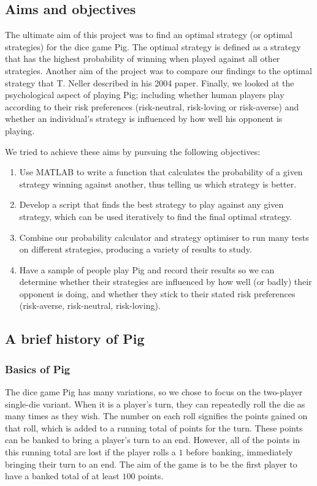 \documentclass[a4paper,titlepage]{article}
\begin{document}
\subsection{Aims and objectives}
The ultimate aim of this project was to find an optimal strategy (or optimal strategies) for the dice game Pig. The optimal strategy is defined as a strategy that has the highest probability of winning when played against all other strategies. Another aim of the project was to compare our findings to the optimal strategy that T. Neller described in his 2004 paper\cite{neller2004optimal}. Finally, we looked at the psychological aspect of playing Pig; including whether human players play according to their risk preferences (risk-neutral, risk-loving or risk-averse) and whether an individual's strategy is influenced by how well his opponent is playing.

We tried to achieve these aims by pursuing the following objectives:

\begin{enumerate}
\item Use MATLAB to write a function that calculates the probability of a given strategy winning against another, thus telling us which strategy is better.

\item Develop a script that finds the best strategy to play against any given strategy, which can be used iteratively to find the final optimal strategy.

\item Combine our probability calculator and strategy optimiser to run many tests on different strategies, producing a variety of results to study.

\item Have a sample of people play Pig and record their results so we can determine whether their strategies are influenced by how well (or badly) their opponent is doing, and whether they stick to their stated risk preferences (risk-averse, risk-neutral, risk-loving).
\end{enumerate}

\subsection{A brief history of Pig}
\subsubsection{Basics of Pig}
The dice game Pig has many variations, so we chose to focus on the two-player single-die variant. When it is a player's turn, they can repeatedly roll the die as many times as they wish. The number on each roll signifies the points gained on that roll, which is added to a running total of points for the turn. These points can be banked to bring a player's turn to an end. However, all of the points in this running total are lost if the player rolls a $1$ before banking, immediately bringing their turn to an end. The aim of the game is to be the first player to have a banked total of at least $100$ points.
\end{document}
